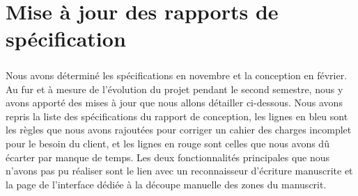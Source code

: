 \chapter{Mise à jour des rapports de spécification}

\paragraph{}
Nous avons déterminé les spécifications en novembre et la conception en février. Au fur et à mesure de l'évolution du projet pendant le second semestre, nous y avons apporté des mises à jour que nous allons détailler ci-dessous. Nous avons repris la liste des spécifications du rapport de conception, les lignes en bleu sont les règles que nous avons rajoutées pour corriger un cahier des charges incomplet pour le besoin du client, et les lignes en rouge sont celles que nous avons dû écarter par manque de temps. Les deux fonctionnalités principales que nous n'avons pas pu réaliser sont le lien avec un reconnaisseur d'écriture manuscrite et la page de l'interface dédiée à la découpe manuelle des zones du manuscrit.

